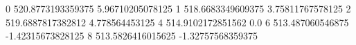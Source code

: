 0 520.8773193359375 5.96710205078125
1 518.6683349609375 3.75811767578125
2 519.6887817382812 4.778564453125
4 514.9102172851562 0.0
6 513.487060546875 -1.42315673828125
8 513.5826416015625 -1.32757568359375
